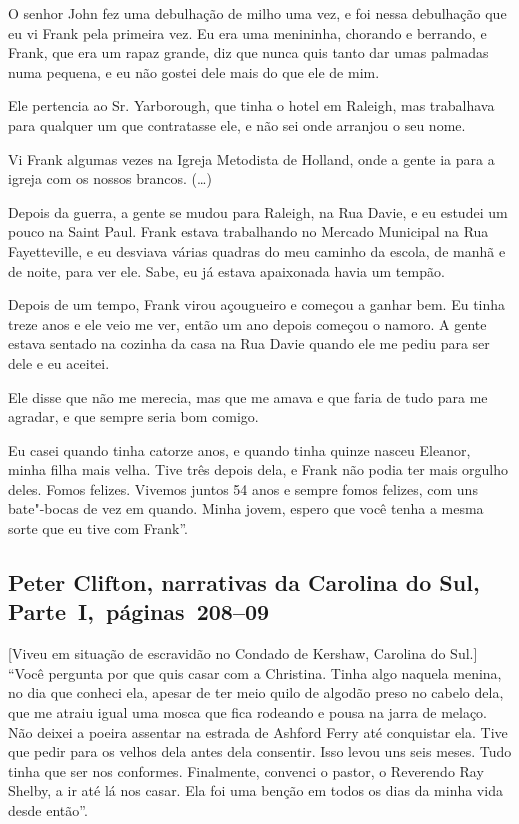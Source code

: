 O senhor John fez uma debulhação de milho uma vez, e foi nessa
debulhação que eu vi Frank pela primeira vez. Eu era uma menininha,
chorando e berrando, e Frank, que era um rapaz grande, diz que nunca
quis tanto dar umas palmadas numa pequena, e eu não gostei dele mais do
que ele de mim.

Ele pertencia ao Sr. Yarborough, que tinha o hotel em Raleigh, mas
trabalhava para qualquer um que contratasse ele, e não sei onde arranjou
o seu nome.

Vi Frank algumas vezes na Igreja Metodista de Holland, onde a gente ia
para a igreja com os nossos brancos. (\ldots{})

Depois da guerra, a gente se mudou para Raleigh, na Rua Davie, e eu
estudei um pouco na Saint Paul. Frank estava trabalhando no Mercado
Municipal na Rua Fayetteville, e eu desviava várias quadras do meu
caminho da escola, de manhã e de noite, para ver ele. Sabe, eu já estava
apaixonada havia um tempão.

Depois de um tempo, Frank virou açougueiro e começou a ganhar bem. Eu
tinha treze anos e ele veio me ver, então um ano depois começou o
namoro. A gente estava sentado na cozinha da casa na Rua Davie quando
ele me pediu para ser dele e eu aceitei.

Ele disse que não me merecia, mas que me amava e que faria de tudo para
me agradar, e que sempre seria bom comigo.

Eu casei quando tinha catorze anos, e quando tinha quinze nasceu
Eleanor, minha filha mais velha. Tive três depois dela, e Frank não
podia ter mais orgulho deles. Fomos felizes. Vivemos juntos 54 anos e
sempre fomos felizes, com uns bate"-bocas de vez em quando. Minha jovem,
espero que você tenha a mesma sorte que eu tive com Frank''.

\subsection{Peter Clifton, narrativas da Carolina do Sul, Parte~I,~páginas~208--09}

{[}Viveu em situação de escravidão no Condado de Kershaw, Carolina do Sul.{]} ``Você pergunta por que quis casar com a Christina. Tinha algo naquela
menina, no dia que conheci ela, apesar de ter meio quilo de algodão
preso no cabelo dela, que me atraiu igual uma mosca que fica rodeando e
pousa na jarra de melaço. Não deixei a poeira assentar na estrada de
Ashford Ferry até conquistar ela. Tive que pedir para os velhos dela
antes dela consentir. Isso levou uns seis meses. Tudo tinha que ser nos
conformes. Finalmente, convenci o pastor, o Reverendo Ray Shelby, a ir
até lá nos casar. Ela foi uma benção em todos os dias da minha vida
desde então''.

